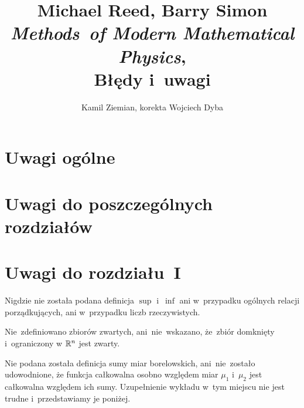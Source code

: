 \documentclass[a4paper,11pt]{article}
\title{Michael Reed, Barry Simon \textit{Methods~of Modern Mathematical
    Physics},
  \parencite{Reed-Simon-Methods-of-modern-mathematical-physics-Vol-I-Pub-1980} \\
  {\Large Błędy i~uwagi}}
\author{Kamil Ziemian, korekta Wojciech Dyba}
\numberwithin{equation}{section}
\begin{document}





\maketitle





\section{Uwagi ogólne}

\label{sec:-ETC-Uwagi-ogolne}





\section{Uwagi do poszczególnych rozdziałów}

\label{sec:-ETC-Uwagi-ogolne}



\section{Uwagi do rozdziału~I}

\label{sec:-ETC-Uwagi-ogolne}


\noindent
Nigdzie nie została podana definicja $\sup$ i~$\inf$ ani
w~przypadku ogólnych relacji porządkujących, ani w~przypadku liczb
rzeczywistych. %

\VerSpaceFour





\noindent
Nie~zdefiniowano zbiorów zwartych, ani~nie~wskazano, że~zbiór
domknięty i~ograniczony w $\mathbb{R}^{ n }$ jest zwarty.

\VerSpaceFour





\noindent
Nie podana została definicja sumy miar borelowskich,
ani~nie~zostało udowodnione, że funkcja całkowalna osobno względem
miar $\mu_{ 1 }$ i~$\mu_{ 2 }$ jest całkowalna względem ich sumy.
Uzupełnienie wykładu w~tym miejscu nie jest trudne i~przedstawiamy je
poniżej.
\end{document}
